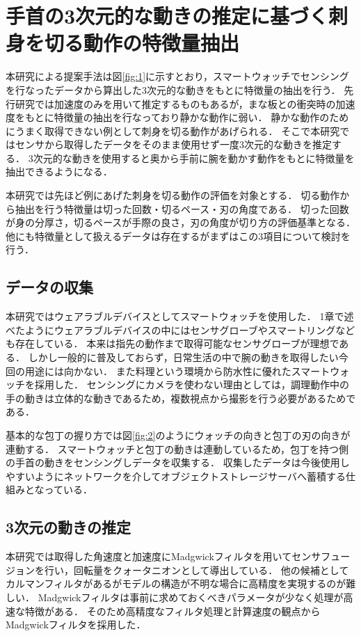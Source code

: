 \section{手首の3次元的な動きの推定に基づく刺身を切る動作の特徴量抽出}
本研究による提案手法は図\ref{fig:1}に示すとおり，スマートウォッチでセンシングを行なったデータから算出した3次元的な動きをもとに特徴量の抽出を行う．
先行研究\cite{kumazawaanalysis}では加速度のみを用いて推定するものもあるが，まな板との衝突時の加速度をもとに特徴量の抽出を行なっており静かな動作に弱い．
静かな動作のためにうまく取得できない例として刺身を切る動作があげられる．
そこで本研究ではセンサから取得したデータをそのまま使用せず一度3次元的な動きを推定する．
3次元的な動きを使用すると奥から手前に腕を動かす動作をもとに特徴量を抽出できるようになる．

本研究では先ほど例にあげた刺身を切る動作の評価を対象とする．
切る動作から抽出を行う特徴量は切った回数・切るペース・刃の角度である．
切った回数が身の分厚さ，切るペースが手際の良さ，刃の角度が切り方の評価基準となる．
他にも特徴量として扱えるデータは存在するがまずはこの3項目について検討を行う．



\subsection{データの収集}
本研究ではウェアラブルデバイスとしてスマートウォッチを使用した．
1章で述べたようにウェアラブルデバイスの中にはセンサグローブやスマートリングなども存在している．
本来は指先の動作まで取得可能なセンサグローブが理想である．
しかし一般的に普及しておらず，日常生活の中で腕の動きを取得したい今回の用途には向かない．
また料理という環境から防水性に優れたスマートウォッチを採用した．
センシングにカメラを使わない理由としては，調理動作中の手の動きは立体的な動きであるため，複数視点から撮影を行う必要があるためである．

基本的な包丁の握り方では図\ref{fig:2}のようにウォッチの向きと包丁の刃の向きが連動する．
スマートウォッチと包丁の動きは連動しているため，包丁を持つ側の手首の動きをセンシングしデータを収集する．
収集したデータは今後使用しやすいようにネットワークを介してオブジェクトストレージサーバへ蓄積する仕組みとなっている．
\subsection{3次元の動きの推定}
本研究では取得した角速度と加速度にMadgwickフィルタを用いてセンサフュージョンを行い，回転量をクォータニオンとして導出している．
他の候補としてカルマンフィルタがあるがモデルの構造が不明な場合に高精度を実現するのが難しい．
Madgwickフィルタは事前に求めておくべきパラメータが少なく処理が高速な特徴がある．
そのため高精度なフィルタ処理と計算速度の観点からMadgwickフィルタを採用した．



